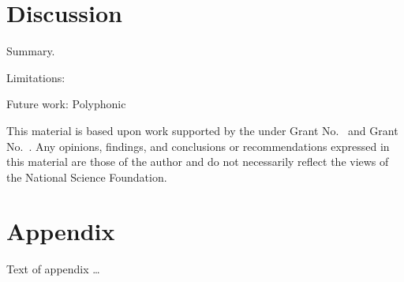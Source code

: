 \documentclass[acmsmall,review,anonymous]{acmart}\settopmatter{printfolios=true,printccs=false,printacmref=false}
\begin{document}
\section{Discussion}

Summary. 

Limitations: 

Future work: Polyphonic


\begin{acks}                            %
  This material is based upon work supported by the
   under Grant
  No.~ and Grant
  No.~.  Any opinions, findings, and
  conclusions or recommendations expressed in this material are those
  of the author and do not necessarily reflect the views of the
  National Science Foundation.
\end{acks}


%


\appendix
\section{Appendix}

Text of appendix \ldots
\end{document}
